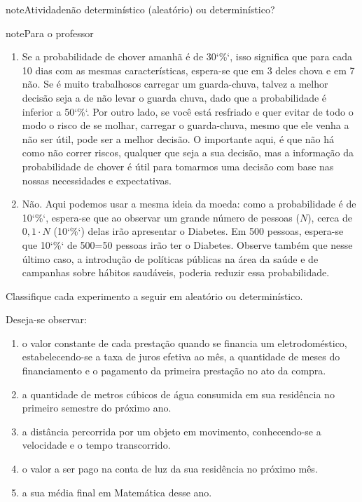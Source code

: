 \begin{sphinxadmonition}{note}{Atividade}{não determinístico (aleatório) ou determinístico?}
\begin{sphinxadmonition}{note}{Para o professor}
\begin{enumerate}
\item {} 
Se a probabilidade de chover amanhã é de 30{}`\%{}`, isso significa que para cada 10 dias com as mesmas características, espera-se que em 3 deles chova e em 7 não. Se é muito trabalhosos carregar um guarda-chuva, talvez a melhor decisão seja a de não levar o guarda chuva, dado que a probabilidade é inferior a 50{}`\%{}`. Por outro lado, se você está resfriado e quer evitar de todo o modo o risco de se molhar, carregar o guarda-chuva, mesmo que ele venha a não ser útil, pode ser a melhor decisão. O importante aqui, é que não há como não correr riscos, qualquer que seja a sua decisão, mas a informação da probabilidade de chover é útil para tomarmos uma decisão com base nas nossas necessidades e expectativas.

\item {} 
Não. Aqui podemos usar a mesma ideia da moeda: como a probabilidade é de 10{}`\%{}`, espera-se que ao observar um grande número de pessoas (\(N\)), cerca de \(0,1\cdot N\) (10{}`\%{}`) delas irão apresentar o Diabetes. Em 500 pessoas, espera-se que 10{}`\%{}` de 500=50 pessoas irão ter o Diabetes. Observe também que nesse último caso, a introdução de políticas públicas na área da saúde e de campanhas sobre hábitos saudáveis, poderia reduzir essa probabilidade.

\end{enumerate}
\end{sphinxadmonition}

Classifique cada experimento a seguir em aleatório ou determinístico.

Deseja-se observar:
\begin{enumerate}
\item {} 
o valor constante de cada prestação quando se financia um eletrodoméstico, estabelecendo-se a taxa de juros efetiva ao mês, a quantidade de meses do financiamento e o pagamento da primeira prestação no ato da compra.

\item {} 
a quantidade de metros cúbicos de água consumida em sua residência no primeiro semestre do próximo ano.

\item {} 
a distância percorrida por um objeto em movimento, conhecendo-se a velocidade e o tempo transcorrido.

\item {} 
o valor a ser pago na conta de luz da sua residência no próximo mês.

\item {} 
a sua média final em Matemática desse ano.

\end{enumerate}
\end{sphinxadmonition}
